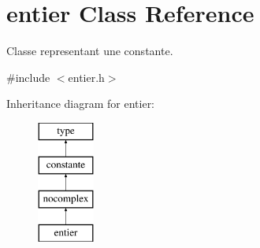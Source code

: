 \hypertarget{classentier}{\section{entier Class Reference}
\label{classentier}
}


Classe representant une constante.  




{\ttfamily \#include $<$entier.\-h$>$}

Inheritance diagram for entier\-:\begin{figure}[H]
\begin{center}
\leavevmode
\includegraphics[height=4.000000cm]{classentier}
\end{center}
\end{figure}
